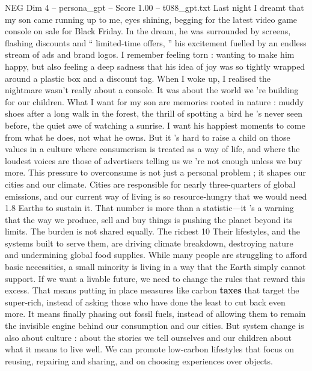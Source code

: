 \begin{textsample}{NEG Dim 4 – persona\_gpt – Score 1.00 – t088\_gpt.txt}  \label{ex:f4_neg_035}
Last night I dreamt that my son came running up to me, eyes shining, begging for the latest video game console on sale for Black Friday.
In the dream, he was surrounded by screens, flashing discounts and “ limited-time offers, ” his excitement fuelled by an endless stream of ads and brand logos.
I remember feeling torn : wanting to make him happy, but also feeling a deep sadness that his idea of joy was so tightly wrapped around a plastic box and a discount tag.
When I woke up, I realised the nightmare wasn't really about a console.
It was about the world we ’re building for our children.
What I want for my son are memories rooted in nature : muddy shoes after a long walk in the forest, the thrill of spotting a bird he ’s never seen before, the quiet awe of watching a sunrise.
I want his happiest moments to come from what he does, not what he owns.
But it ’s hard to raise a child on those values in a culture where consumerism is treated as a way of life, and where the loudest voices are those of advertisers telling us we ’re not enough unless we buy more.
This pressure to overconsume is not just a personal problem ; it shapes our cities and our climate.
Cities are responsible for nearly three-quarters of global emissions, and our current way of living is so resource-hungry that we would need 1.8 Earths to sustain it.
That number is more than a statistic—it ’s a warning that the way we produce, sell and buy things is pushing the planet beyond its limits.
The burden is not shared equally.
The richest 10 %
Their lifestyles, and the systems built to serve them, are driving climate breakdown, destroying nature and undermining global food supplies.
While many people are struggling to afford basic necessities, a small minority is living in a way that the Earth simply cannot support.
If we want a livable future, we need to change the rules that reward this excess.
That means putting in place measures like carbon \textbf{taxes} that target the super‑rich, instead of asking those who have done the least to cut back even more.
It means finally phasing out fossil fuels, instead of allowing them to remain the invisible engine behind our consumption and our cities.
But system change is also about culture : about the stories we tell ourselves and our children about what it means to live well.
We can promote low‑carbon lifestyles that focus on reusing, repairing and sharing, and on choosing experiences over objects.

\end{textsample}
